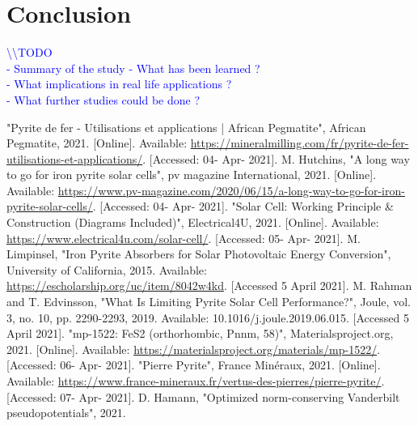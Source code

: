 \documentclass[11pt,a4paper]{article}
\begin{document}
\section{Conclusion}
\textcolor{blue}{
\textbackslash\textbackslash TODO\\
- Summary of the study
- What has been learned ? \\
- What implications in real life applications ?\\
- What further studies could be done ?}
\newpage
\begin{thebibliography}{00}
 "Pyrite de fer - Utilisations et applications | African Pegmatite", African Pegmatite, 2021. [Online]. Available: \url{https://mineralmilling.com/fr/pyrite-de-fer-utilisations-et-applications/}. [Accessed: 04- Apr- 2021].
 M. Hutchins, "A long way to go for iron pyrite solar cells", pv magazine International, 2021. [Online]. Available: \url{https://www.pv-magazine.com/2020/06/15/a-long-way-to-go-for-iron-pyrite-solar-cells/}. [Accessed: 04- Apr- 2021].
 "Solar Cell: Working Principle \& Construction (Diagrams Included)", Electrical4U, 2021. [Online]. Available: \url{https://www.electrical4u.com/solar-cell/}. [Accessed: 05- Apr- 2021].
 M. Limpinsel, "Iron Pyrite Absorbers for Solar Photovoltaic Energy Conversion", University of California, 2015. Available: \url{https://escholarship.org/uc/item/8042w4kd}. [Accessed 5 April 2021].
 M. Rahman and T. Edvinsson, "What Is Limiting Pyrite Solar Cell Performance?", Joule, vol. 3, no. 10, pp. 2290-2293, 2019. Available: 10.1016/j.joule.2019.06.015. [Accessed 5 April 2021].
 "mp-1522: FeS2 (orthorhombic, Pnnm, 58)", Materialsproject.org, 2021. [Online]. Available: \url{https://materialsproject.org/materials/mp-1522/}. [Accessed: 06- Apr- 2021].
"Pierre Pyrite", France Minéraux, 2021. [Online]. Available: \url{https://www.france-mineraux.fr/vertus-des-pierres/pierre-pyrite/}. [Accessed: 07- Apr- 2021].
 D. Hamann, "Optimized norm-conserving Vanderbilt pseudopotentials", 2021.
\end{thebibliography}
\newpage
\appendix
\end{document}
